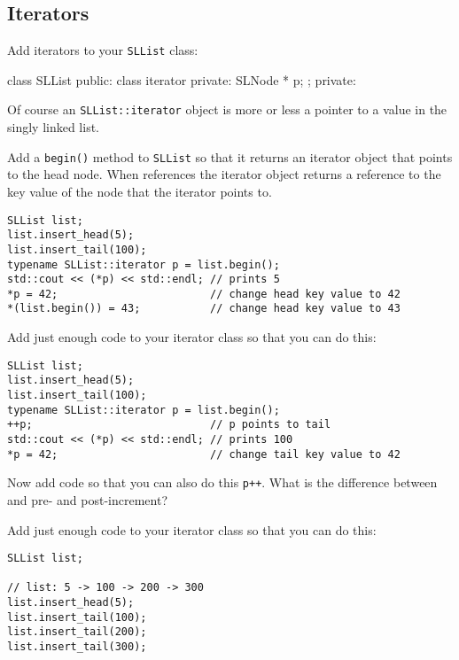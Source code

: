 {\newpage
\subsection{Iterators}

Add iterators to your \texttt{SLList} class:
{\small
\begin{console}
class SLList
{
public:
    class iterator
    {
    private:
        SLNode * p;
    };    
private:
}
\end{console}
}
Of course an \texttt{SLList::iterator} object is more or less a pointer
to a value in the singly linked list.

\begin{ex}
Add a \texttt{begin()} method to \texttt{SLList} so that it
returns an iterator object that points to the head node.
When references the iterator object returns a reference to the
key value of the node that the iterator points to.
{\small
\begin{Verbatim}[frame=single]
SLList list;
list.insert_head(5);
list.insert_tail(100);
typename SLList::iterator p = list.begin();
std::cout << (*p) << std::endl; // prints 5
*p = 42;                        // change head key value to 42
*(list.begin()) = 43;           // change head key value to 43
\end{Verbatim}
}
\end{ex}

\begin{ex}
Add just enough code to your iterator class so that you can do this:
{\small
\begin{Verbatim}[frame=single]
SLList list;
list.insert_head(5);
list.insert_tail(100);
typename SLList::iterator p = list.begin();
++p;                            // p points to tail
std::cout << (*p) << std::endl; // prints 100
*p = 42;                        // change tail key value to 42
\end{Verbatim}
}
\end{ex}


\begin{ex}
Now add code so that you can also do this
\texttt{p++}.
What is the difference between and pre- and post-increment?
\end{ex}


\begin{ex}
Add just enough code to your iterator class so that you can do this:
{\small
\begin{Verbatim}[frame=single]
SLList list;

// list: 5 -> 100 -> 200 -> 300
list.insert_head(5);
list.insert_tail(100);
list.insert_tail(200);
list.insert_tail(300);


\end{Verbatim}}
\end{ex}}
